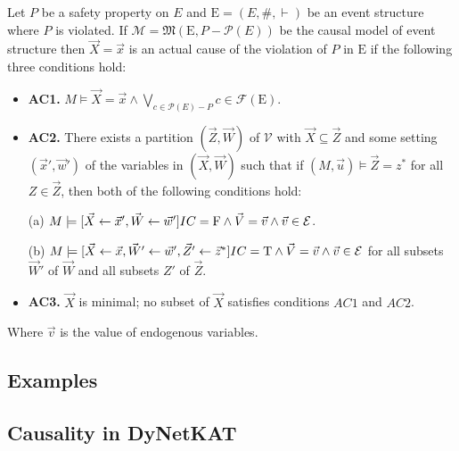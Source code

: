 \begin{definition}
    Let $P$ be a safety property on $E$ and $\mathrm{E} = (E,\#,\vdash)$ be an event structure where $P$ is violated.
    If $\mathcal{M} = \mathfrak{M}(\mathrm{E}, P - \mathcal{P}(E))$
    be the causal model of event structure then $\vec X = \vec x$ is
    an actual cause of the violation of $P$ in $\mathrm{E}$ if the
    following three conditions hold:
    \begin{itemize}
        \item  \textbf{AC1.} $M\models \vec X = \vec x
                  \wedge \bigvee_{c \in \mathcal{P}(E) - P}c \in \mathcal{F}(\mathrm{E})$.
        \item  \textbf{AC2. }There exists a partition $(\vec Z, \vec W)$ of $\mathcal{V}$ with $\vec X \subseteq \vec Z$ and some setting $(\vec x',\vec w')$ of the variables in $(\vec X,\vec W)$ such that if $(M,\vec u)\models \vec Z = z^*$ for all $Z\in \vec Z$, then both of the following conditions hold:

              (a) $M \models[\vec X \leftarrow \vec x', \vec W \leftarrow \vec w']
                  IC = \mathrm{F}
                  \wedge \vec V = \vec v
                  \wedge  \vec v \in \mathcal{E}$.

              (b) $M \models[\vec X\leftarrow \vec x, \vec W' \leftarrow \vec w', \vec Z'\leftarrow \vec z^*]
                  IC = \mathrm{T}
                  \wedge \vec V = \vec v
                  \wedge \vec v \in \mathcal{E}$
              for all subsets $\vec W'$ of $\vec W$ and all subsets $Z'$ of $\vec Z$.

        \item  \textbf{AC3.} $\vec X$ is minimal; no subset of $\vec X$ satisfies conditions $AC1$ and $AC2$.
    \end{itemize}
    Where $\vec v$ is the value of endogenous variables.
\end{definition}
\pagebreak


\subsection{Examples}


\subsection{Causality in DyNetKAT}
